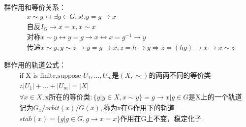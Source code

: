 \documentclass[12pt, a4paper]{article}  %
\begin{document}
群作用和等价关系：
\begin{align}
    &x\sim y\leftrightarrow \exists g\in G,st. y=g\rightarrow x\\
    &\text{自反}I_G\rightarrow x=x,x\sim x\\
    &\text{对称}x \sim y\leftrightarrow y=g\rightarrow x\leftrightarrow x=g^{-1}\rightarrow y \\
    &\text{传递}x\sim y,y\sim z\rightarrow y=g\rightarrow x,z=h\rightarrow y\Rightarrow z=(hg)\rightarrow x\rightarrow x\sim z
\end{align}

群作用的轨道公式：
\begin{align}
    &\text{if X is finite,suppose }U_1,...,U_m\text{是}(X,\sim)\text{的两两不同的等价类}\\
    &\therefore |U_1|+...+|U_m|=|X|\\
    &\forall x\in X,\text{x所在的等价类}:\{y|y\in X,x\sim y\}={g\rightarrow x|g\in G}\text{是X上的一个轨道}\\
    &\text{记为}G_x/orbit(x)/G(x),\text{称为x在G作用下的轨道}\\
    &stab(x)=\{g|g\in G,g\rightarrow x=x\}\text{作用在G上不变，稳定化子}
\end{align}
\end{document}
